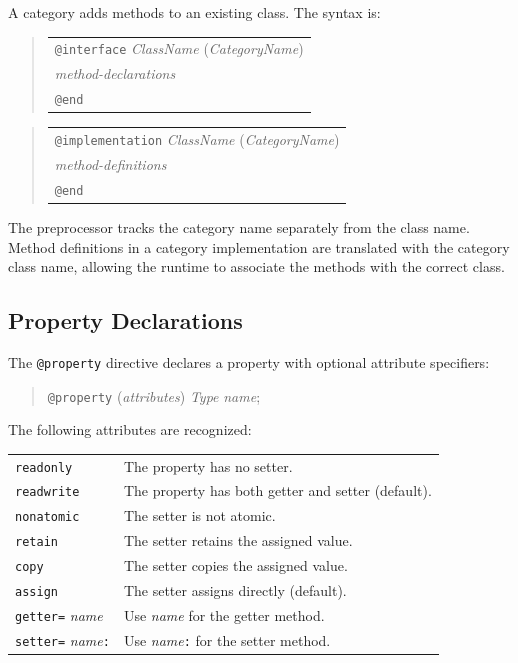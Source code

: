 \documentclass[11pt,twoside]{article}
\newcommand{\meta}[1]{{\itshape #1}}
\begin{document}
A category adds methods to an existing class.  The syntax is:
\begin{quote}
\begin{tabular}{l}
{\tt @interface} {\meta{ClassName}} ({\meta{CategoryName}})\\
{\meta{method-declarations}}\\
{\tt @end}
\end{tabular}
\end{quote}
\begin{quote}
\begin{tabular}{l}
{\tt @implementation} {\meta{ClassName}} ({\meta{CategoryName}})\\
{\meta{method-definitions}}\\
{\tt @end}
\end{tabular}
\end{quote}

The preprocessor tracks the category name separately from the class
name.  Method definitions in a category implementation are translated
with the category class name, allowing the runtime to associate the
methods with the correct class.

\subsection{Property Declarations}

The {\tt @property} directive declares a property with optional attribute
specifiers:
\begin{quote}
{\tt @property} ({\meta{attributes}}) {\meta{Type}} {\meta{name}};
\end{quote}

The following attributes are recognized:

\medskip
\noindent
\begin{tabularx}{\textwidth}{lX}
{\tt readonly}     & The property has no setter. \\
{\tt readwrite}    & The property has both getter and setter (default). \\
{\tt nonatomic}    & The setter is not atomic. \\
{\tt retain}       & The setter retains the assigned value. \\
{\tt copy}         & The setter copies the assigned value. \\
{\tt assign}       & The setter assigns directly (default). \\
{\tt getter=} {\meta{name}}
                   & Use {\meta{name}} for the getter method. \\
{\tt setter=} {\meta{name}}{\tt :}
                   & Use {\meta{name}}{\tt :} for the setter method. \\
\end{tabularx}
\end{document}
